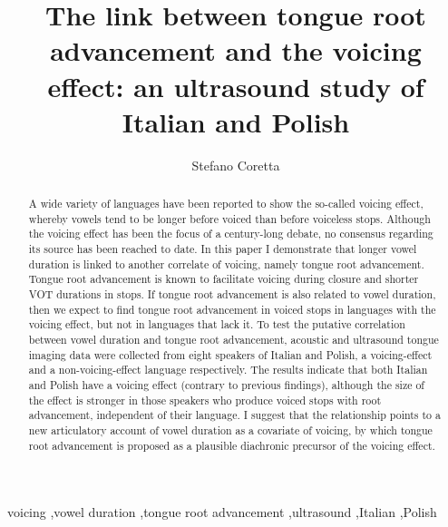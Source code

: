 \documentclass[authoryear, 5p]{elsarticle}
\date{}
\begin{document}
\begin{frontmatter}

\title{The link between tongue root advancement and the voicing effect: an ultrasound study of Italian and Polish}

\author[mcr]{Stefano Coretta}
\address[mcr]{University of Manchester, Linguistics and English Language}

\begin{abstract}

A wide variety of languages have been reported to show the so-called voicing effect, whereby vowels tend to be longer before voiced than before voiceless stops.
Although the voicing effect has been the focus of a century-long debate, no consensus regarding its source has been reached to date.
In this paper I demonstrate that longer vowel duration is linked to another correlate of voicing, namely tongue root advancement.
Tongue root advancement is known to facilitate voicing during closure and shorter VOT durations in stops.
If tongue root advancement is also related to vowel duration, then we expect to find tongue root advancement in voiced stops in languages with the voicing effect, but not in languages that lack it.
To test the putative correlation between vowel duration and tongue root advancement, acoustic and ultrasound tongue imaging data were collected from eight speakers of Italian and Polish, a voicing-effect and a non-voicing-effect language respectively.
The results indicate that both Italian and Polish have a voicing effect (contrary to previous findings), although the size of the effect is stronger in those speakers who produce voiced stops with root advancement, independent of their language.
I suggest that the relationship points to a new articulatory account of vowel duration as a covariate of voicing, by which tongue root advancement is proposed as a plausible diachronic precursor of the voicing effect.




\end{abstract}

\begin{keyword}
voicing \sep vowel duration \sep tongue root advancement \sep ultrasound \sep Italian \sep Polish
\end{keyword}

\end{frontmatter}
\end{document}
